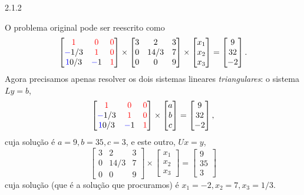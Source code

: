 \begin{Solucao}{2.1.2}
\begin{enumerate}[label=\alph*)]
O problema original pode ser reescrito como
$$\begin{bmatrix}
{\textcolor{red}1}	&{\textcolor{red}0}	&{\textcolor{red}0}\\
{\textcolor{blue}-1/3 }	&{\textcolor{red}1}	&{\textcolor{red}0}\\
{\textcolor{blue} 10/3 }	&{\textcolor{blue}-1}	&{\textcolor{red}1}
\end{bmatrix}\times
\begin{bmatrix}
3	&2	&3\\
0	&14/3	&7\\
0	&0	&9
\end{bmatrix}\times
\begin{bmatrix}
x_1\\x_2\\x_3
\end{bmatrix}=
\begin{bmatrix}
9\\32\\-2
\end{bmatrix}.$$
Agora precisamos apenas resolver os dois sistemas lineares \emph{triangulares}: o sistema $Ly=b$,
$$\begin{bmatrix}
{\textcolor{red}1}	&{\textcolor{red}0}	&{\textcolor{red}0}\\
{\textcolor{blue}-1/3 }	&{\textcolor{red}1}	&{\textcolor{red}0}\\
{\textcolor{blue} 10/3 }	&{\textcolor{blue}-1}	&{\textcolor{red}1}
\end{bmatrix}\times
\begin{bmatrix}
a\\b\\c
\end{bmatrix}=
\begin{bmatrix}
9\\32\\-2
\end{bmatrix},$$
cuja solução é $a=9, b=35, c=3$, e este outro, $Ux=y$,
$$\begin{bmatrix}
3	&2	&3\\
0	&14/3	&7\\
0	&0	&9
\end{bmatrix}\times
\begin{bmatrix}
x_1\\x_2\\x_3
\end{bmatrix}=
\begin{bmatrix}
9\\35\\3
\end{bmatrix}
$$
cuja solução (que é a solução que procuramos) é $x_1=-2, x_2=7, x_3=1/3$.
\end{enumerate}
\end{Solucao}
